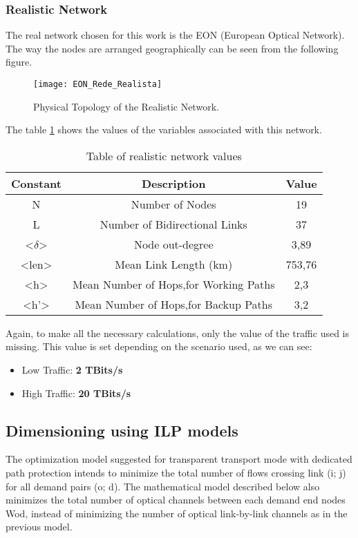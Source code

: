 \subsubsection{Realistic Network}
The real network chosen for this work is the EON (European Optical Network).
The way the nodes are arranged geographically can be seen from the following figure.

\begin{figure}[h!]
\centering
\texttt{[image: EON\_Rede\_Realista]}
\caption{Physical Topology of the Realistic Network.}
\end{figure}

The table \ref{table:2} shows the values of the variables associated with this network.
\begin{table}[h!]
\centering
\begin{tabular}{|| c | c | c||}
 \hline
 Constant & Description & Value \\
 \hline\hline
 N & Number of Nodes & 19 \\
 L & Number of Bidirectional Links & 37 \\
 <$\delta$> & Node out-degree & 3,89 \\
 <len> & Mean Link Length (km) & 753,76 \\
 <h> & Mean Number of Hops,for Working Paths & 2,3 \\
 <h'> & Mean Number of Hops,for Backup Paths & 3,2 \\
 \hline
\end{tabular}
\caption{Table of realistic network values}
\label{table:2}
\end{table}

Again, to make all the necessary calculations, only the value of the traffic used is missing. This value is set depending on the scenario used, as we can see:

\begin{itemize}
  \item Low Traffic: \textbf{2 TBits/s}
  \item High Traffic: \textbf{20 TBits/s}
\end{itemize}

\subsection{Dimensioning using ILP models}

The optimization model suggested for transparent transport mode with dedicated path protection intends to minimize the total number of flows crossing link (i; j) for all demand pairs (o; d). The mathematical model described below also minimizes the total number of optical channels between each demand end nodes Wod, instead of minimizing the number of optical link-by-link channels as in the previous model.

